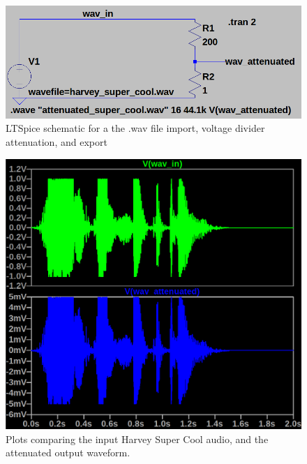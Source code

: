 \documentclass[11pt]{article}
\begin{document}
	\begin{figure}[h]
		\centering
		\includegraphics[width=0.85\linewidth]{task_1_ab_schematic}
		\caption{LTSpice schematic for a the .wav file import, voltage divider attenuation, and export}
		\label{fig:T1_PA_SCHEMATIC}
		\vspace{1mm}
	\end{figure}

	\begin{figure}[h]
		\centering
		\includegraphics[width=0.85\linewidth]{task1_a_wav_before_and_after}
		\caption{Plots comparing the input Harvey Super Cool audio, and the attenuated output waveform.}
		\label{fig:T1_PA_RESULT}
		\vspace{1mm}
	\end{figure}
	
\end{document}

